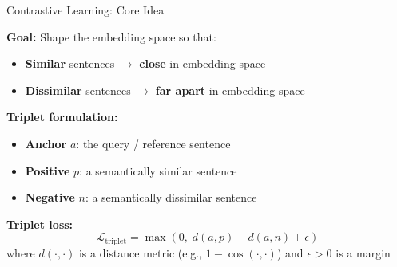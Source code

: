 \documentclass[11pt,compress,t,notes=noshow, xcolor=table]{beamer}
\begin{document}

\begin{frame}{Contrastive Learning: Core Idea}

\vfill

\textbf{Goal:} Shape the embedding space so that: 
\begin{itemize}
  \item \textbf{Similar} sentences $\to$ \textbf{close} in embedding space
  \item \textbf{Dissimilar} sentences $\to$ \textbf{far apart} in embedding space
\end{itemize}

\vspace{1em}

\textbf{Triplet formulation:}
\begin{itemize}
  \item \textbf{Anchor} $a$: the query / reference sentence
  \item \textbf{Positive} $p$: a semantically similar sentence
  \item \textbf{Negative} $n$: a semantically dissimilar sentence
\end{itemize}

\vfill

\textbf{Triplet loss:}
$$\mathcal{L}_\text{triplet} = \max\!\left(0,\; d(a, p) - d(a, n) + \epsilon\right)$$
where $d(\cdot, \cdot)$ is a distance metric (e.g., $1 - \cos(\cdot, \cdot)$) and $\epsilon > 0$ is a margin

\vfill

\end{frame}

\end{document}
